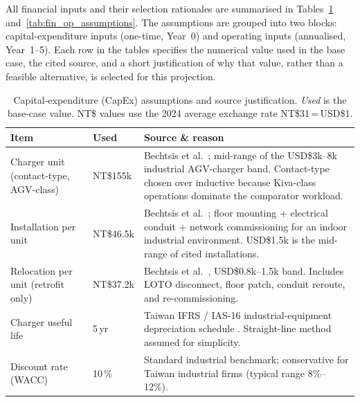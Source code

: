 \documentclass[conference]{IEEEtran}
\begin{document}
All financial inputs and their selection rationales are summarised in Tables~\ref{tab:fin_capex_assumptions} and~\ref{tab:fin_op_assumptions}. The assumptions are grouped into two blocks: capital-expenditure inputs (one-time, Year~0) and operating inputs (annualised, Year~1--5). Each row in the tables specifies the numerical value used in the base case, the cited source, and a short justification of why that value, rather than a feasible alternative, is selected for this projection.

\begin{table}[t]
  \centering
  \caption{Capital-expenditure (CapEx) assumptions and source justification. \emph{Used} is the base-case value. NT\$ values use the 2024 average exchange rate \mbox{NT\$31\,=\,USD\$1}.}
  \label{tab:fin_capex_assumptions}
  \footnotesize
  \setlength{\tabcolsep}{3pt}
  \begin{tabular}{p{}p{}p{}}
    \toprule
    Item & Used & Source \& reason \\
    \midrule
    Charger unit (contact-type, AGV-class)
      & NT\$155k & Bechtsis et al.~\cite{bechtsis2017}; mid-range of the USD\$3k--8k industrial AGV-charger band. Contact-type chosen over inductive because Kiva-class operations dominate the comparator workload. \\
    \addlinespace
    Installation per unit
      & NT\$46.5k & Bechtsis et al.~\cite{bechtsis2017}; floor mounting + electrical conduit + network commissioning for an indoor industrial environment. USD\$1.5k is the mid-range of cited installations. \\
    \addlinespace
    Relocation per unit (retrofit only)
      & NT\$37.2k & Bechtsis et al.~\cite{bechtsis2017}, USD\$0.8k--1.5k band. Includes LOTO disconnect, floor patch, conduit reroute, and re-commissioning. \\
    \addlinespace
    Charger useful life
      & 5\,yr & Taiwan IFRS / IAS-16 industrial-equipment depreciation schedule \cite{taiwanmof}. Straight-line method assumed for simplicity. \\
    \addlinespace
    Discount rate (WACC)
      & 10\,\% & Standard industrial benchmark; conservative for Taiwan industrial firms (typical range 8\%--12\%). \\
    \bottomrule
  \end{tabular}
\end{table}
\end{document}
